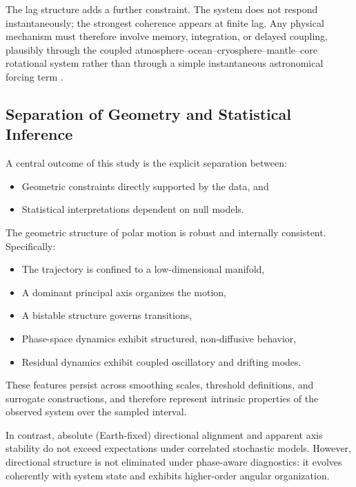 \documentclass[twocolumn,9pt]{revtex4-2}
\begin{document}
The lag structure adds a further constraint. The system does not respond instantaneously; the strongest coherence appears at finite lag. Any physical mechanism must therefore involve memory, integration, or delayed coupling, plausibly through the coupled atmosphere--ocean--cryosphere--mantle--core rotational system rather than through a simple instantaneous astronomical forcing term \citep{munk1960,lambeck1980,gross2007}.
\subsection{Separation of Geometry and Statistical Inference}
\label{subsec:separation_of_geometry_and_statistical_inference}

A central outcome of this study is the explicit separation
between:

\begin{itemize}
\item Geometric constraints directly supported by the data, and
\item Statistical interpretations dependent on null models.
\end{itemize}

The geometric structure of polar motion is robust and
internally consistent. Specifically:

\begin{itemize}
\item The trajectory is confined to a low-dimensional manifold,
\item A dominant principal axis organizes the motion,
\item A bistable structure governs transitions,
\item Phase-space dynamics exhibit structured,
non-diffusive behavior,
\item Residual dynamics exhibit coupled oscillatory and
drifting modes.
\end{itemize}

These features persist across smoothing scales,
threshold definitions, and surrogate constructions,
and therefore represent intrinsic properties of the
observed system over the sampled interval.

In contrast, absolute (Earth-fixed) directional alignment
and apparent axis stability do not exceed expectations
under correlated stochastic models. However, directional
structure is not eliminated under phase-aware diagnostics:
it evolves coherently with system state and exhibits
higher-order angular organization.
\end{document}
